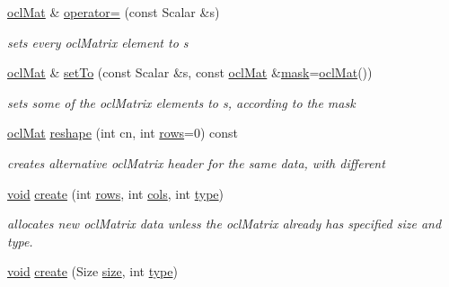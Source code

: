 \begin{DoxyCompactItemize}
\item 
\hyperlink{classcv_1_1ocl_1_1oclMat}{ocl\-Mat} \& \hyperlink{classcv_1_1ocl_1_1oclMat_aaa6ceaeab62d67ecf2e6e53e2eb2e907}{operator=} (const Scalar \&s)
\begin{DoxyCompactList}\small\item\em sets every ocl\-Matrix element to s \end{DoxyCompactList}\item 
\hyperlink{classcv_1_1ocl_1_1oclMat}{ocl\-Mat} \& \hyperlink{classcv_1_1ocl_1_1oclMat_af7211da97e0a6838e6cfc252d202a93b}{set\-To} (const Scalar \&s, const \hyperlink{classcv_1_1ocl_1_1oclMat}{ocl\-Mat} \&\hyperlink{tracking_8hpp_a6b13ecd2fd6ec7ad422f1d7863c3ad19}{mask}=\hyperlink{classcv_1_1ocl_1_1oclMat}{ocl\-Mat}())
\begin{DoxyCompactList}\small\item\em sets some of the ocl\-Matrix elements to s, according to the mask \end{DoxyCompactList}\item 
\hyperlink{classcv_1_1ocl_1_1oclMat}{ocl\-Mat} \hyperlink{classcv_1_1ocl_1_1oclMat_ae53a7bd4ac1386e0cddf2a95eed51a2e}{reshape} (int cn, int \hyperlink{classcv_1_1ocl_1_1oclMat_a1ccf0125fff51e419aa89b144ed511be}{rows}=0) const 
\begin{DoxyCompactList}\small\item\em creates alternative ocl\-Matrix header for the same data, with different \end{DoxyCompactList}\item 
\hyperlink{legacy_8hpp_a8bb47f092d473522721002c86c13b94e}{void} \hyperlink{classcv_1_1ocl_1_1oclMat_aa230a306d044e659d535e9ecfca2ab31}{create} (int \hyperlink{classcv_1_1ocl_1_1oclMat_a1ccf0125fff51e419aa89b144ed511be}{rows}, int \hyperlink{classcv_1_1ocl_1_1oclMat_ac814acb1fd2613d43e5fbb9c2166ac9f}{cols}, int \hyperlink{classcv_1_1ocl_1_1oclMat_acf6fe0735d1dac151e2c301f01470827}{type})
\begin{DoxyCompactList}\small\item\em allocates new ocl\-Matrix data unless the ocl\-Matrix already has specified size and type. \end{DoxyCompactList}\item 
\hyperlink{legacy_8hpp_a8bb47f092d473522721002c86c13b94e}{void} \hyperlink{classcv_1_1ocl_1_1oclMat_a89ec842b647387a3e932dd2e79a83f2f}{create} (Size \hyperlink{classcv_1_1ocl_1_1oclMat_a21384709f0d43efd26d0c70edc7adf8a}{size}, int \hyperlink{classcv_1_1ocl_1_1oclMat_acf6fe0735d1dac151e2c301f01470827}{type})

\end{DoxyCompactItemize}
